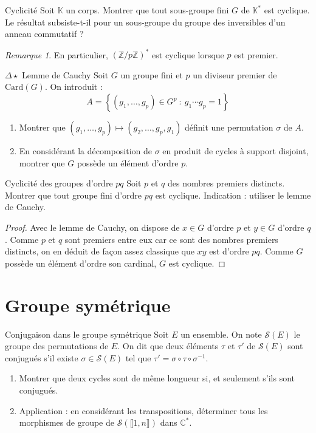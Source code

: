 \documentclass[french,a4paper]{article}
\newcommand{\Z}{\mathbb{Z}}
\newcommand{\C}{\mathbb{C}}
\newcommand{\K}{\mathbb{K}}
\newcommand{\st}{^*}
\newcommand{\inv}{^{-1}}
\newcommand{\card}{\text{Card}}
\theoremstyle{plain}
\theoremstyle{definition}
\theoremstyle{remark}
\newtheorem*{rmq}{Remarque}
\begin{document}
\begin{ex}[Moulin.AG.44]{Cyclicité}
	Soit $\K$ un corps. Montrer que tout sous-groupe fini $G$ de $\K\st$ est cyclique. Le résultat subsiste-t-il pour un sous-groupe du groupe des inversibles d'un anneau commutatif ?
\end{ex}

\begin{rmq}
	En particulier, $(\Z/p\Z)\st$ est cyclique lorsque $p$ est premier.
\end{rmq}

\begin{ex}[Moulin.AG.23]{$\Delta\star$ Lemme de Cauchy}
	Soit $G$ un groupe fini et $p$ un diviseur premier de $\card(G)$. On introduit : $$A=\left\{(g_1,\ldots,g_p)\in G^p\ : \ g_1\cdots g_p=1\right\}$$
	\begin{enumerate}
		\item Montrer que $(g_1,\ldots,g_p)\mapsto(g_2,\ldots,g_p,g_1)$ définit une permutation $\sigma$ de $A$.
		\item En considérant la décomposition de $\sigma$ en produit de cycles à support disjoint, montrer que $G$ possède un élément d'ordre $p$.
	\end{enumerate}
\end{ex}

\begin{ex}[X]{Cyclicité des groupes d'ordre $pq$}
	Soit $p$ et $q$ des nombres premiers distincts. Montrer que tout groupe fini d'ordre $pq$ est cyclique. Indication : utiliser le lemme de Cauchy.
\end{ex}

\begin{proof}
	Avec le lemme de Cauchy, on dispose de $x\in G$ d'ordre $p$ et $y\in G$ d'ordre $q$. Comme $p$ et $q$ sont premiers entre eux car ce sont des nombres premiers distincts, on en déduit de façon assez classique que $xy$ est d'ordre $pq$. Comme $G$ possède un élément d'ordre son cardinal, $G$ est cyclique.
\end{proof}

\section{Groupe symétrique}

\begin{ex}[Moulin.AG.24]{Conjugaison dans le groupe symétrique}
	Soit $E$ un ensemble. On note $\mathcal{S}(E)$ le groupe des permutations de $E$. On dit que deux éléments $\tau$ et $\tau'$ de $\mathcal{S}(E)$ sont conjugués s'il existe $\sigma\in\mathcal{S}(E)$ tel que $\tau'=\sigma\circ\tau\circ\sigma\inv$.
	\begin{enumerate}
		\item Montrer que deux cycles sont de même longueur si, et seulement s'ils sont conjugués.
		\item Application : en considérant les transpositions, déterminer tous les morphismes de groupe de $\mathcal{S}(\llbracket1,n\rrbracket)$ dans $\C\st$.
	\end{enumerate}
\end{ex}
\end{document}
